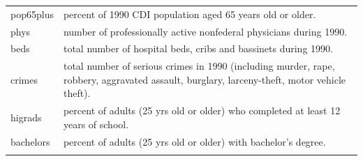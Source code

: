 \documentclass[]{article}
\begin{document}
\begin{longtable}[]{@{}ll@{}}
\begin{minipage}[t]{0.11\columnwidth}\raggedright\strut
pop65plus\strut
\end{minipage} & \begin{minipage}[t]{0.84\columnwidth}\raggedright\strut
percent of 1990 CDI population aged 65 years old or older.\strut
\end{minipage}\tabularnewline
\begin{minipage}[t]{0.11\columnwidth}\raggedright\strut
phys\strut
\end{minipage} & \begin{minipage}[t]{0.84\columnwidth}\raggedright\strut
number of professionally active nonfederal physicians during 1990.\strut
\end{minipage}\tabularnewline
\begin{minipage}[t]{0.11\columnwidth}\raggedright\strut
beds\strut
\end{minipage} & \begin{minipage}[t]{0.84\columnwidth}\raggedright\strut
total number of hospital beds, cribs and bassinets during 1990.\strut
\end{minipage}\tabularnewline
\begin{minipage}[t]{0.11\columnwidth}\raggedright\strut
crimes\strut
\end{minipage} & \begin{minipage}[t]{0.84\columnwidth}\raggedright\strut
total number of serious crimes in 1990 (including murder, rape, robbery,
aggravated assault, burglary, larceny-theft, motor vehicle theft).\strut
\end{minipage}\tabularnewline
\begin{minipage}[t]{0.11\columnwidth}\raggedright\strut
higrads\strut
\end{minipage} & \begin{minipage}[t]{0.84\columnwidth}\raggedright\strut
percent of adults (25 yrs old or older) who completed at least 12 years
of school.\strut
\end{minipage}\tabularnewline
\begin{minipage}[t]{0.11\columnwidth}\raggedright\strut
bachelors\strut
\end{minipage} & \begin{minipage}[t]{0.84\columnwidth}\raggedright\strut
percent of adults (25 yrs old or older) with bachelor's degree.\strut
\end{minipage}\tabularnewline
\begin{minipage}[t]{0.11\columnwidth}\raggedright\strut

\end{minipage}
\end{longtable}
\end{document}
